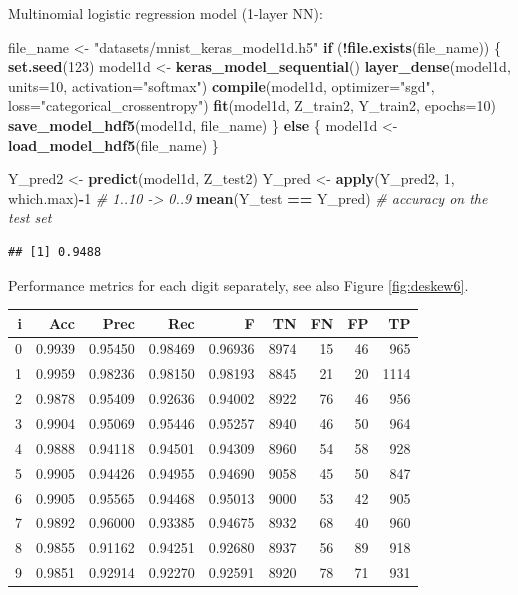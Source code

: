 \documentclass[10pt,b5paper,krantz1]{krantz}
\newenvironment{Shaded}{\begin{snugshade}}{\end{snugshade}}
\newcommand{\CommentTok}[1]{\textcolor[rgb]{0.37,0.37,0.37}{\textit{#1}}}
\newcommand{\ControlFlowTok}[1]{\textcolor[rgb]{0.27,0.27,0.27}{\textbf{#1}}}
\newcommand{\DataTypeTok}[1]{\textcolor[rgb]{0.27,0.27,0.27}{#1}}
\newcommand{\DecValTok}[1]{\textcolor[rgb]{0.06,0.06,0.06}{#1}}
\newcommand{\KeywordTok}[1]{\textcolor[rgb]{0.27,0.27,0.27}{\textbf{#1}}}
\newcommand{\NormalTok}[1]{#1}
\newcommand{\OperatorTok}[1]{\textcolor[rgb]{0.43,0.43,0.43}{\textbf{#1}}}
\newcommand{\StringTok}[1]{\textcolor[rgb]{0.5,0.5,0.5}{#1}}
\begin{document}
Multinomial logistic regression model (1-layer NN):

\begin{Shaded}
\begin{Highlighting}[]
\NormalTok{file_name <-}\StringTok{ "datasets/mnist_keras_model1d.h5"}
\ControlFlowTok{if}\NormalTok{ (}\OperatorTok{!}\KeywordTok{file.exists}\NormalTok{(file_name)) \{}
    \KeywordTok{set.seed}\NormalTok{(}\DecValTok{123}\NormalTok{)}
\NormalTok{    model1d <-}\StringTok{ }\KeywordTok{keras_model_sequential}\NormalTok{()}
    \KeywordTok{layer_dense}\NormalTok{(model1d, }\DataTypeTok{units=}\DecValTok{10}\NormalTok{, }\DataTypeTok{activation=}\StringTok{"softmax"}\NormalTok{)}
    \KeywordTok{compile}\NormalTok{(model1d, }\DataTypeTok{optimizer=}\StringTok{"sgd"}\NormalTok{,}
            \DataTypeTok{loss=}\StringTok{"categorical_crossentropy"}\NormalTok{)}
    \KeywordTok{fit}\NormalTok{(model1d, Z_train2, Y_train2, }\DataTypeTok{epochs=}\DecValTok{10}\NormalTok{)}
    \KeywordTok{save_model_hdf5}\NormalTok{(model1d, file_name)}
\NormalTok{\} }\ControlFlowTok{else}\NormalTok{ \{}
\NormalTok{    model1d <-}\StringTok{ }\KeywordTok{load_model_hdf5}\NormalTok{(file_name)}
\NormalTok{\}}

\NormalTok{Y_pred2 <-}\StringTok{ }\KeywordTok{predict}\NormalTok{(model1d, Z_test2)}
\NormalTok{Y_pred <-}\StringTok{ }\KeywordTok{apply}\NormalTok{(Y_pred2, }\DecValTok{1}\NormalTok{, which.max)}\OperatorTok{-}\DecValTok{1} \CommentTok{# 1..10 -> 0..9}
\KeywordTok{mean}\NormalTok{(Y_test }\OperatorTok{==}\StringTok{ }\NormalTok{Y_pred) }\CommentTok{# accuracy on the test set}
\end{Highlighting}
\end{Shaded}

\begin{verbatim}
## [1] 0.9488
\end{verbatim}

Performance metrics for each digit separately,
see also Figure \ref{fig:deskew6}.

\begin{longtable}[]{@{}rrrrrrrrr@{}}
\toprule
i & Acc & Prec & Rec & F & TN & FN & FP & TP\tabularnewline
\midrule
\endhead
0 & 0.9939 & 0.95450 & 0.98469 & 0.96936 & 8974 & 15 & 46 & 965\tabularnewline
1 & 0.9959 & 0.98236 & 0.98150 & 0.98193 & 8845 & 21 & 20 & 1114\tabularnewline
2 & 0.9878 & 0.95409 & 0.92636 & 0.94002 & 8922 & 76 & 46 & 956\tabularnewline
3 & 0.9904 & 0.95069 & 0.95446 & 0.95257 & 8940 & 46 & 50 & 964\tabularnewline
4 & 0.9888 & 0.94118 & 0.94501 & 0.94309 & 8960 & 54 & 58 & 928\tabularnewline
5 & 0.9905 & 0.94426 & 0.94955 & 0.94690 & 9058 & 45 & 50 & 847\tabularnewline
6 & 0.9905 & 0.95565 & 0.94468 & 0.95013 & 9000 & 53 & 42 & 905\tabularnewline
7 & 0.9892 & 0.96000 & 0.93385 & 0.94675 & 8932 & 68 & 40 & 960\tabularnewline
8 & 0.9855 & 0.91162 & 0.94251 & 0.92680 & 8937 & 56 & 89 & 918\tabularnewline
9 & 0.9851 & 0.92914 & 0.92270 & 0.92591 & 8920 & 78 & 71 & 931\tabularnewline
\bottomrule
\end{longtable}
\end{document}
